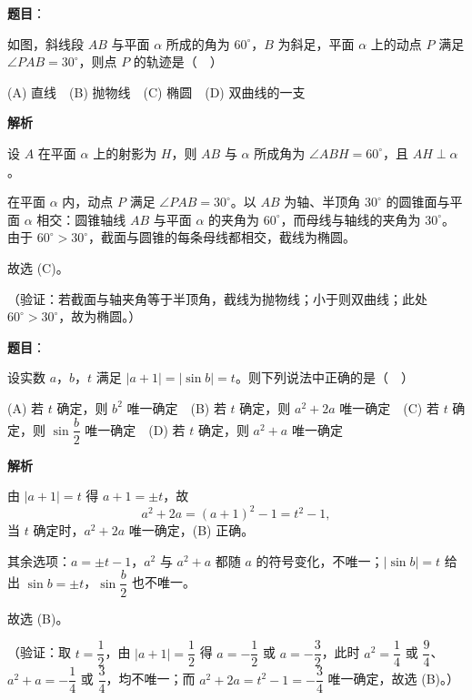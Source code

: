 \begin{answer}

\textbf{题目}：

如图，斜线段 \(AB\) 与平面 \(\alpha\) 所成的角为 \(60^\circ\)，\(B\) 为斜足，平面 \(\alpha\) 上的动点 \(P\) 满足 \(\angle PAB=30^\circ\)，则点 \(P\) 的轨迹是（　）
\nopagebreak[4]
\begin{center}\end{center}
\nopagebreak[4]
(A) 直线　(B) 抛物线　(C) 椭圆　(D) 双曲线的一支

\textbf{解析}

设 \(A\) 在平面 \(\alpha\) 上的射影为 \(H\)，则 \(AB\) 与 \(\alpha\) 所成角为 \(\angle ABH=60^\circ\)，且 \(AH\perp\alpha\)。

在平面 \(\alpha\) 内，动点 \(P\) 满足 \(\angle PAB=30^\circ\)。以 \(AB\) 为轴、半顶角 \(30^\circ\) 的圆锥面与平面 \(\alpha\) 相交：圆锥轴线 \(AB\) 与平面 \(\alpha\) 的夹角为 \(60^\circ\)，而母线与轴线的夹角为 \(30^\circ\)。由于 \(60^\circ>30^\circ\)，截面与圆锥的每条母线都相交，截线为椭圆。

故选 (C)。

（验证：若截面与轴夹角等于半顶角，截线为抛物线；小于则双曲线；此处 \(60^\circ>30^\circ\)，故为椭圆。）


\end{answer}
\begin{answer}

\textbf{题目}：

设实数 \(a\)，\(b\)，\(t\) 满足 \(|a+1|=|\sin b|=t\)。则下列说法中正确的是（　）

(A) 若 \(t\) 确定，则 \(b^2\) 唯一确定　(B) 若 \(t\) 确定，则 \(a^2+2a\) 唯一确定　(C) 若 \(t\) 确定，则 \(\sin\dfrac{b}{2}\) 唯一确定　(D) 若 \(t\) 确定，则 \(a^2+a\) 唯一确定

\textbf{解析}

由 \(|a+1|=t\) 得 \(a+1=\pm t\)，故
\nopagebreak[4]
\[
a^2+2a=(a+1)^2-1=t^2-1,
\]
当 \(t\) 确定时，\(a^2+2a\) 唯一确定，(B) 正确。

其余选项：\(a=\pm t-1\)，\(a^2\) 与 \(a^2+a\) 都随 \(a\) 的符号变化，不唯一；\(|\sin b|=t\) 给出 \(\sin b=\pm t\)，\(\sin\dfrac{b}2\) 也不唯一。

故选 (B)。

（验证：取 \(t=\dfrac12\)，由 \(|a+1|=\dfrac12\) 得 \(a=-\dfrac12\) 或 \(a=-\dfrac32\)，此时 \(a^2=\dfrac14\) 或 \(\dfrac94\)、\(a^2+a=-\dfrac14\) 或 \(\dfrac34\)，均不唯一；而 \(a^2+2a=t^2-1=-\dfrac34\) 唯一确定，故选 (B)。）


\end{answer}

